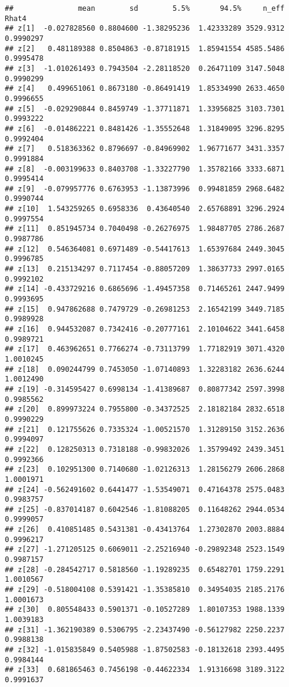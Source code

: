 \documentclass[
]{article}
\begin{document}
\begin{verbatim}
##               mean        sd        5.5%       94.5%     n_eff     Rhat4
## z[1]  -0.027828560 0.8804600 -1.38295236  1.42333289 3529.9312 0.9990297
## z[2]   0.481189388 0.8504863 -0.87181915  1.85941554 4585.5486 0.9995478
## z[3]  -1.010261493 0.7943504 -2.28118520  0.26471109 3147.5048 0.9990299
## z[4]   0.499651061 0.8673180 -0.86491419  1.85334990 2633.4650 0.9996655
## z[5]  -0.029290844 0.8459749 -1.37711871  1.33956825 3103.7301 0.9993222
## z[6]  -0.014862221 0.8481426 -1.35552648  1.31849095 3296.8295 0.9992404
## z[7]   0.518363362 0.8796697 -0.84969902  1.96771677 3431.3357 0.9991884
## z[8]  -0.003199633 0.8403708 -1.33227790  1.35782166 3333.6871 0.9995414
## z[9]  -0.079957776 0.6763953 -1.13873996  0.99481859 2968.6482 0.9990744
## z[10]  1.543259265 0.6958336  0.43640540  2.65768891 3296.2924 0.9997554
## z[11]  0.851945734 0.7040498 -0.26276975  1.98487705 2786.2687 0.9987786
## z[12]  0.546364081 0.6971489 -0.54417613  1.65397684 2449.3045 0.9996785
## z[13]  0.215134297 0.7117454 -0.88057209  1.38637733 2997.0165 0.9992102
## z[14] -0.433729216 0.6865696 -1.49457358  0.71465261 2447.9499 0.9993695
## z[15]  0.947862688 0.7479729 -0.26981253  2.16542199 3449.7185 0.9989928
## z[16]  0.944532087 0.7342416 -0.20777161  2.10104622 3441.6458 0.9989721
## z[17]  0.463962651 0.7766274 -0.73113799  1.77182919 3071.4320 1.0010245
## z[18]  0.090244799 0.7453050 -1.07140893  1.32283182 2636.6244 1.0012490
## z[19] -0.314595427 0.6998134 -1.41389687  0.80877342 2597.3998 0.9985562
## z[20]  0.899973224 0.7955800 -0.34372525  2.18182184 2832.6518 0.9990229
## z[21]  0.121755626 0.7335324 -1.00521570  1.31289150 3152.2636 0.9994097
## z[22]  0.128250313 0.7318188 -0.99832026  1.35799492 2439.3451 0.9992366
## z[23]  0.102951300 0.7140680 -1.02126313  1.28156279 2606.2868 1.0001971
## z[24] -0.562491602 0.6441477 -1.53549071  0.47164378 2575.0483 0.9983757
## z[25] -0.837014187 0.6042546 -1.81088205  0.11648262 2944.0534 0.9999057
## z[26]  0.410851485 0.5431381 -0.43413764  1.27302870 2003.8884 0.9996217
## z[27] -1.271205125 0.6069011 -2.25216940 -0.29892348 2523.1549 0.9987157
## z[28] -0.284542717 0.5818560 -1.19289235  0.65482701 1759.2291 1.0010567
## z[29] -0.518004108 0.5391421 -1.35385810  0.34954035 2185.2176 1.0001673
## z[30]  0.805548433 0.5901371 -0.10527289  1.80107353 1988.1339 1.0039183
## z[31] -1.362190389 0.5306795 -2.23437490 -0.56127982 2250.2237 0.9988138
## z[32] -1.015835849 0.5405988 -1.87502583 -0.18132618 2393.4495 0.9984144
## z[33]  0.681865463 0.7456198 -0.44622334  1.91316698 3189.3122 0.9991637

\end{verbatim}
\end{document}
